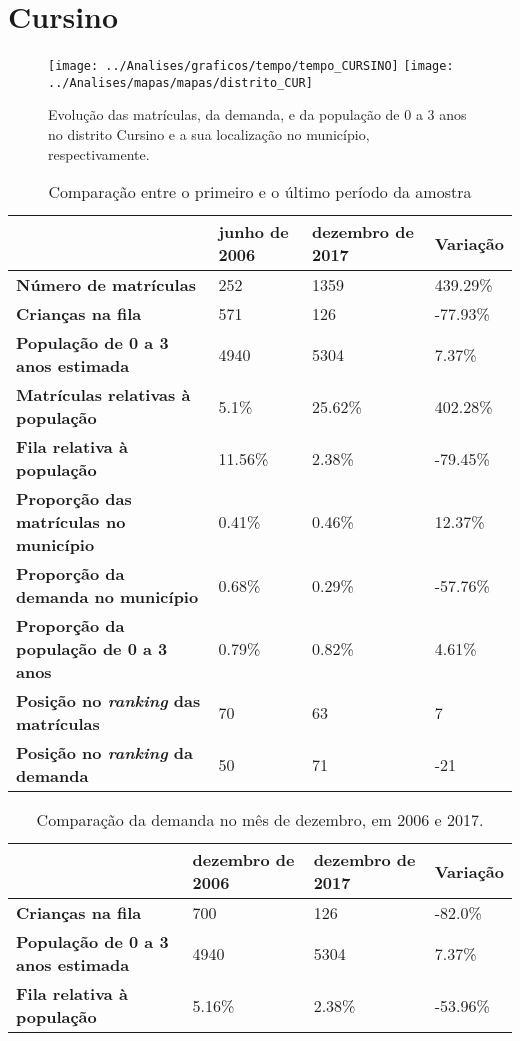 \section{Cursino}
\begin{figure}[H]
\centering
\texttt{[image: ../Analises/graficos/tempo/tempo\_CURSINO]}
\texttt{[image: ../Analises/mapas/mapas/distrito\_CUR]}
\caption{Evolução das matrículas, da demanda, e da população de 0 a 3 anos no distrito Cursino e a sua localização no município, respectivamente.}
\end{figure}
\begin{table}[H]
\begin{tabular}{l|l|l|l}
\textbf{}                                      & \textbf{junho de 2006}       & \textbf{dezembro de 2017}    & \textbf{Variação} \\ \hline
\textbf{Número de matrículas}                  & 252 & 1359 & 439.29\% \\ \hline
\textbf{Crianças na fila}                      & 571 & 126 & -77.93\% \\ \hline
\textbf{População de 0 a 3 anos estimada}      & 4940 & 5304 & 7.37\% \\ \hline
\textbf{Matrículas relativas à população}      & 5.1\% & 25.62\% & 402.28\% \\ \hline
\textbf{Fila relativa à população}             & 11.56\% & 2.38\% & -79.45\% \\ \hline
\textbf{Proporção das matrículas no município} & 0.41\% & 0.46\% & 12.37\% \\ \hline
\textbf{Proporção da demanda no município}     & 0.68\% & 0.29\% & -57.76\% \\ \hline
\textbf{Proporção da população de 0 a 3 anos}  & 0.79\% & 0.82\% & 4.61\% \\ \hline
\textbf{Posição no \textit{ranking} das matrículas}     & 70 & 63 & 7 \\ \hline
\textbf{Posição no \textit{ranking} da demanda}         & 50 & 71 & -21 \\ 
\end{tabular}
\caption{Comparação entre o primeiro e o último período da amostra}
\end{table}
\begin{table}[H]
\begin{tabular}{l|l|l|l}
\textbf{}                                 & \textbf{dezembro de 2006} & \textbf{dezembro de 2017} & \textbf{Variação} \\ \hline
\textbf{Crianças na fila}                      & 700 & 126 & -82.0\% \\ \hline
\textbf{População de 0 a 3 anos estimada}      & 4940 & 5304 & 7.37\% \\ \hline
\textbf{Fila relativa à população}             & 5.16\% & 2.38\% & -53.96\% \\
\end{tabular}
\caption{Comparação da demanda no mês de dezembro, em 2006 e 2017.}
\end{table}
